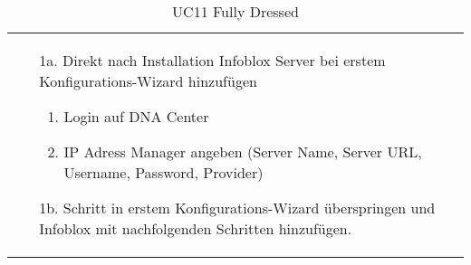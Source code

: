 \begin{table}[H]
\begin{tabularx}{\textwidth}{l | X}
\begin{itemize}
			\item[1a.] Direkt nach Installation Infoblox Server bei erstem Konfigurations-Wizard hinzufügen
			\begin{enumerate}
				\item Login auf DNA Center
				\item IP Adress Manager angeben (Server Name, Server URL, Username, Password, Provider)
			\end{enumerate}
			\item[1b.] Schritt in erstem Konfigurations-Wizard überspringen und Infoblox mit nachfolgenden Schritten hinzufügen.
		\end{itemize}
	\end{tabularx}
	\caption{UC11 Fully Dressed}
	\label{tab:UC11}
\end{table}


